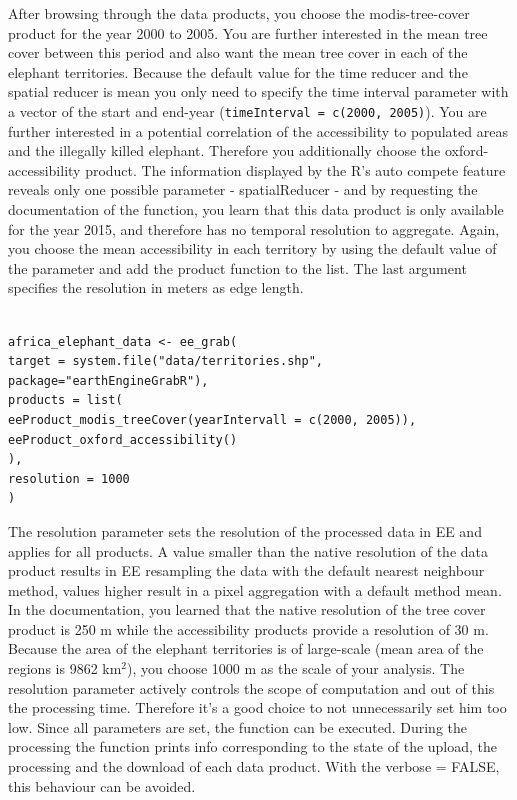 After browsing through the data products, you choose the modis-tree-cover product for the year 2000 to 2005. You are further interested in the mean tree cover between this period and also want the mean tree cover in each of the elephant territories. Because the default value for the time reducer and the spatial reducer is mean you only need to specify the time interval parameter with a vector of the start and end-year (\texttt{timeInterval = c(2000, 2005)}). You are further interested in a potential correlation of the accessibility to populated areas and the illegally killed elephant. Therefore you additionally choose the oxford-accessibility product. The information displayed by the R's auto compete feature reveals only one possible parameter - spatialReducer - and by requesting the documentation of the function, you learn that this data product is only available for the year 2015, and therefore has no temporal resolution to aggregate. Again, you choose the mean accessibility in each territory by using the default value of the parameter and add the product function to the list. The last argument specifies the resolution in meters as edge length. 


\begin{lstlisting}

africa_elephant_data <- ee_grab(
target = system.file("data/territories.shp", package="earthEngineGrabR"),
products = list(
eeProduct_modis_treeCover(yearIntervall = c(2000, 2005)),
eeProduct_oxford_accessibility()
),
resolution = 1000
)
\end{lstlisting}


The resolution parameter sets the resolution of the processed data in EE and applies for all products. A value smaller than the native resolution of the data product results in EE resampling the data with the default nearest neighbour method, values higher result in a pixel aggregation with a default method mean. In the documentation, you learned that the native resolution of the tree cover product is 250 m while the accessibility products provide a resolution of 30 m. Because the area of the elephant territories is of large-scale (mean area of the regions is 9862 km$^2$), you choose 1000 m as the scale of your analysis. The resolution parameter actively controls the scope of computation and out of this the processing time. Therefore it's a good choice to not unnecessarily set him too low. 
Since all parameters are set, the function can be executed. 
During the processing the function prints info corresponding to the state of the upload, the processing and the download of each data product. With the verbose = FALSE, this behaviour can be avoided. 


